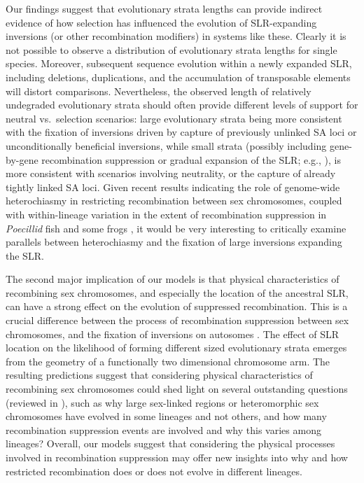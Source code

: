 \documentclass{article}[12pt]
\begin{document}
Our findings suggest that evolutionary strata lengths can provide indirect evidence of how selection has influenced the evolution of SLR-expanding inversions (or other recombination modifiers) in  systems like these. Clearly it is not possible to observe a distribution of evolutionary strata lengths for single species. Moreover, subsequent sequence evolution within a newly expanded SLR, including deletions, duplications, and the accumulation of transposable elements will distort comparisons. Nevertheless, the observed length of relatively undegraded evolutionary strata should often provide different levels of support for neutral vs.~selection scenarios: large evolutionary strata being more consistent with the fixation of inversions driven by capture of previously unlinked SA loci or unconditionally beneficial inversions, while small strata (possibly including gene-by-gene recombination suppression or gradual expansion of the SLR; e.g., \citealt{BergeroQiuCharlesworth2013, QiuBergeroCharlesworth2015}), is more consistent with scenarios involving neutrality, or the capture of already tightly linked SA loci. Given recent results indicating the role of genome-wide heterochiasmy in restricting recombination between sex chromosomes, coupled with within-lineage variation in the extent of recombination suppression in {\itshape Poecillid} fish and some frogs \citep[e.g.,][]{Wright2017, BergeroCharlesworth2019, DaroltiWrightMank2019, FurmanEvans2018}, it would be very interesting to critically examine parallels between heterochiasmy and the fixation of large inversions expanding the SLR.

The second major implication of our models is that physical characteristics of recombining sex chromosomes, and especially the location of the ancestral SLR, can have a strong effect on the evolution of suppressed recombination. This is a crucial difference between the process of recombination suppression between sex chromosomes, and the fixation of inversions on autosomes \citep{ConnallonOlito2021}. The effect of SLR location on the likelihood of forming different sized evolutionary strata emerges from the geometry of a functionally two dimensional chromosome arm. The resulting predictions suggest that considering physical characteristics of recombining sex chromosomes could shed light on several outstanding questions (reviewed in \citealt{Charlesworth2016, Charlesworth2017}), such as why large sex-linked regions or heteromorphic sex chromosomes have evolved in some lineages and not others, and how many recombination suppression events are involved and why this varies among lineages? Overall, our models suggest that considering the physical processes involved in recombination suppression may offer new insights into why and how restricted recombination does or does not evolve in different lineages.%
\end{document}
